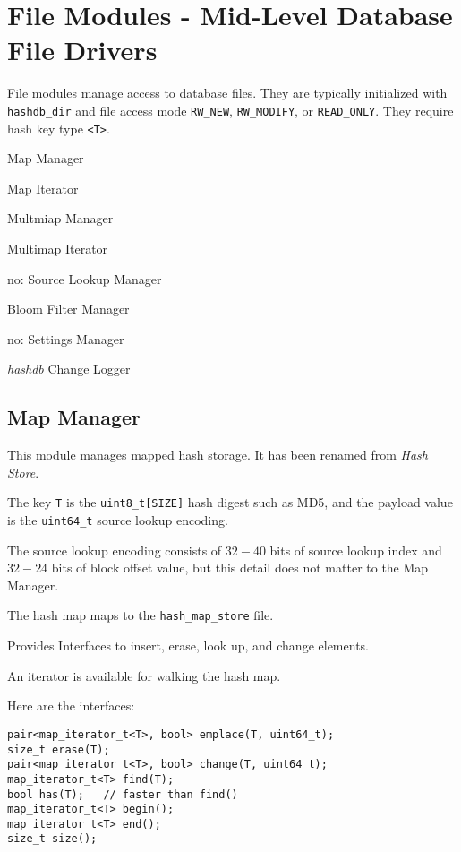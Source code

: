 \documentclass[12pt,twoside]{article}
\newcommand{\hdb}{\emph{hashdb}\xspace}
\begin{document}
\section{File Modules - Mid-Level Database File Drivers}
File modules manage access to database files.
They are typically initialized with \texttt{hashdb\_dir} and file access mode
\texttt{RW\_NEW}, \texttt{RW\_MODIFY}, or \texttt{READ\_ONLY}.
They require hash key type \texttt{<T>}.

\begin{compactitem}
\item Map Manager
\item Map Iterator
\item Multmiap Manager
\item Multimap Iterator
\item no: Source Lookup Manager
\item Bloom Filter Manager
\item no: Settings Manager
\item \hdb Change Logger
\end{compactitem}

\subsection{Map Manager}
This module manages mapped hash storage.
It has been renamed from \textit{Hash Store}.
\begin{compactitem}
\item The key \texttt{T} is the \texttt{uint8\_t[SIZE]} hash digest such as MD5,
and the payload value is the \texttt{uint64\_t} source lookup encoding.
\item The source lookup encoding consists of $32-40$ bits
of source lookup index and $32-24$ bits of block offset value,
but this detail does not matter to the Map Manager.
\item The hash map maps to the \texttt{hash\_map\_store} file.
\item Provides Interfaces to insert, erase, look up, and change elements.
\item An iterator is available for walking the hash map.
\end{compactitem}

Here are the interfaces:
\begin{small}
\begin{verbatim}
pair<map_iterator_t<T>, bool> emplace(T, uint64_t);
size_t erase(T);
pair<map_iterator_t<T>, bool> change(T, uint64_t);
map_iterator_t<T> find(T);
bool has(T);   // faster than find()
map_iterator_t<T> begin();
map_iterator_t<T> end();
size_t size();
\end{verbatim}
\end{small}
\end{document}

